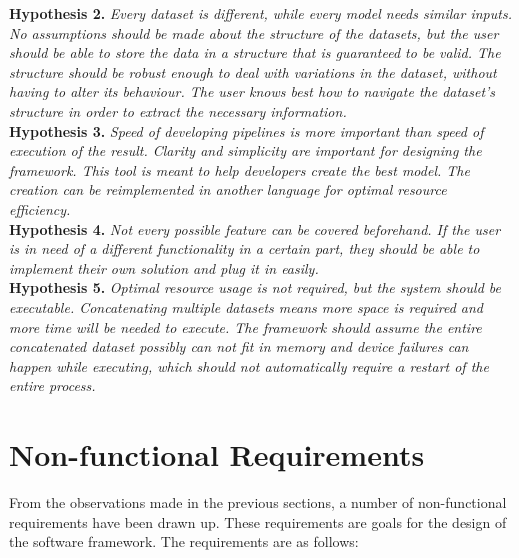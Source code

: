 \textbf{Hypothesis 2.} \textit{Every dataset is different, while every model needs similar inputs. No assumptions should be made about the structure of the datasets, but the user should be able to store the data in a structure that is guaranteed to be valid. The structure should be robust enough to deal with variations in the dataset, without having to alter its behaviour. The user knows best how to navigate the dataset's structure in order to extract the necessary information.}\\

\textbf{Hypothesis 3.} \textit{Speed of developing pipelines is more important than speed of execution of the result. Clarity and simplicity are important for designing the framework. This tool is meant to help developers create the best model. The creation can be reimplemented in another language for optimal resource efficiency.}\\

\textbf{Hypothesis 4.} \textit{Not every possible feature can be covered beforehand. If the user is in need of a different functionality in a certain part, they should be able to implement their own solution and plug it in easily.}\\

\textbf{Hypothesis 5.} \textit{Optimal resource usage is not required, but the system should be executable. Concatenating multiple datasets means more space is required and more time will be needed to execute. The framework should assume the entire concatenated dataset possibly can not fit in memory and device failures can happen while executing, which should not automatically require a restart of the entire process.}\\

\section{Non-functional Requirements} \label{problem:nonfunc}

From the observations made in the previous sections, a number of non-functional requirements have been drawn up. These requirements are goals for the design of the software framework. The requirements are as follows:

